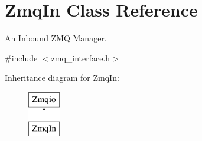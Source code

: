 \hypertarget{classZmqIn}{\section{Zmq\-In Class Reference}
\label{classZmqIn}
}


An Inbound Z\-M\-Q Manager.  




{\ttfamily \#include $<$zmq\-\_\-interface.\-h$>$}

Inheritance diagram for Zmq\-In\-:\begin{figure}[H]
\begin{center}
\leavevmode
\includegraphics[height=2.000000cm]{classZmqIn}
\end{center}
\end{figure}
